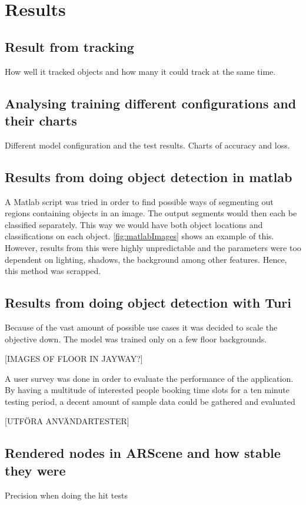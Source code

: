 \section{Results}
\subsection{Result from tracking}

How well it tracked objects and how many it could track at the same time.

\subsection{Analysing training different configurations and their charts}

Different model configuration and the test results. Charts of accuracy and loss.

\subsection{Results from doing object detection in matlab}
A Matlab script was tried in order to find possible ways of segmenting out regions containing objects in an image. The output segments would then each be classified separately. This way we would have both object locations and classifications on each object. \ref{fig:matlabImages} shows an example of this. However, results from this were highly unpredictable and the parameters were too dependent on lighting, shadows, the background among other features. Hence, this method was scrapped.

\subsection{Results from doing object detection with Turi}
Because of the vast amount of possible use cases it was decided to scale the objective down. The model was trained only on a few floor backgrounds. 

[IMAGES OF FLOOR IN JAYWAY?]

A user survey was done in order to evaluate the performance of the application. By having a multitude of interested people booking time slots for a ten minute testing period, a decent amount of sample data could be gathered and evaluated

[UTFÖRA ANVÄNDARTESTER]

\subsection{Rendered nodes in ARScene and how stable they were}
Precision when doing the hit tests

